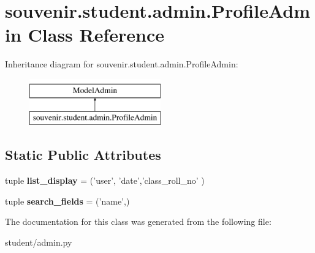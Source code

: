 \hypertarget{classsouvenir_1_1student_1_1admin_1_1ProfileAdmin}{\section{souvenir.\-student.\-admin.\-Profile\-Admin Class Reference}
\label{classsouvenir_1_1student_1_1admin_1_1ProfileAdmin}
}
Inheritance diagram for souvenir.\-student.\-admin.\-Profile\-Admin\-:\begin{figure}[H]
\begin{center}
\leavevmode
\includegraphics[height=2.000000cm]{classsouvenir_1_1student_1_1admin_1_1ProfileAdmin}
\end{center}
\end{figure}
\subsection*{Static Public Attributes}
\begin{DoxyCompactItemize}
\item 
\hypertarget{classsouvenir_1_1student_1_1admin_1_1ProfileAdmin_a94fa44d8697bbb753b95e0635afefd0b}{tuple {\bfseries list\-\_\-display} = ('user', 'date','class\-\_\-roll\-\_\-no' )}\label{classsouvenir_1_1student_1_1admin_1_1ProfileAdmin_a94fa44d8697bbb753b95e0635afefd0b}

\item 
\hypertarget{classsouvenir_1_1student_1_1admin_1_1ProfileAdmin_a2b502e49f87006f711b757a2f2167600}{tuple {\bfseries search\-\_\-fields} = ('name',)}\label{classsouvenir_1_1student_1_1admin_1_1ProfileAdmin_a2b502e49f87006f711b757a2f2167600}

\end{DoxyCompactItemize}


The documentation for this class was generated from the following file\-:\begin{DoxyCompactItemize}
\item 
student/admin.\-py\end{DoxyCompactItemize}
